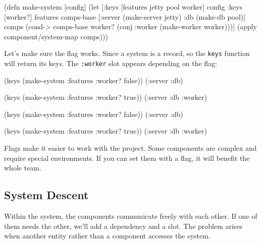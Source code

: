 \else

\begin{english}
  \begin{clojure}
(defn make-system [config]
  (let [{:keys [features jetty pool worker]} config
        {:keys [worker?]} features
        comps-base [:server (make-server jetty)
                    :db (make-db pool)]
        comps (cond-> comps-base
                worker?
                (conj :worker (make-worker worker)))]
    (apply component/system-map comps)))
  \end{clojure}
\end{english}

\fi

Let's make sure the flag works. Since a system is a record, so the \verb|keys| function will return its keys. The \verb|:worker| slot appears depending on the flag:

\ifnarrow

\begin{english}
  \begin{clojure}
(keys (make-system
        {:features {:worker? false}}))
(:server :db)

(keys (make-system
        {:features {:worker? true}}))
(:server :db :worker)
  \end{clojure}
\end{english}

\else

\begin{english}
  \begin{clojure}
(keys (make-system {:features {:worker? false}}))
(:server :db)

(keys (make-system {:features {:worker? true}}))
(:server :db :worker)
  \end{clojure}
\end{english}

\fi

Flags make it easier to work with the project. Some components are complex and require special environments. If you can set them with a flag, it will benefit the whole team.

\subsection{System Descent}


Within the system, the components communicate freely with each other. If one of them needs the other, we'll add a dependency and a slot. The problem arises when another entity rather than a component accesses the system.

